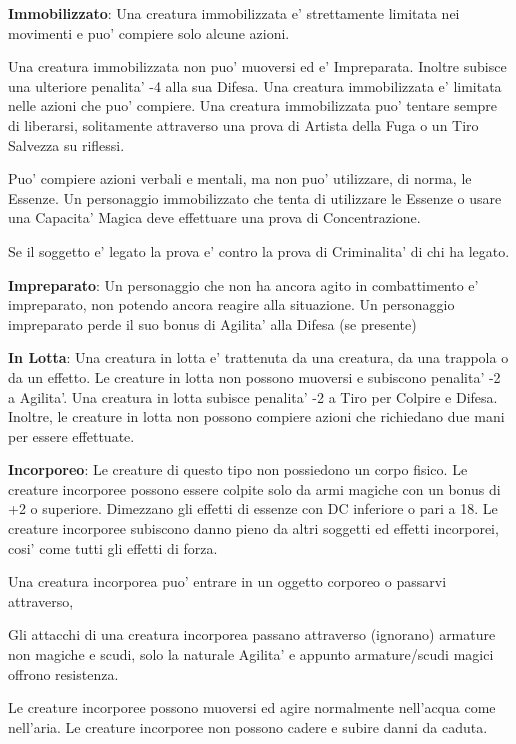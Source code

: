 \documentclass[a4paper,11pt,twoside,openany]{book}
\begin{document}
{		\textbf{Immobilizzato}: Una creatura immobilizzata e' strettamente limitata nei movimenti e puo' compiere solo alcune azioni.
		
		Una creatura immobilizzata non puo' muoversi ed e' Impreparata. Inoltre subisce una ulteriore penalita' -4 alla sua Difesa. Una creatura immobilizzata e' limitata nelle azioni che puo' compiere. Una creatura immobilizzata puo' tentare sempre di liberarsi, solitamente attraverso una prova di Artista della Fuga o un Tiro Salvezza su riflessi.
		
		Puo' compiere azioni verbali e mentali, ma non puo' utilizzare, di norma, le Essenze. Un personaggio immobilizzato che tenta di utilizzare le Essenze o usare una Capacita' Magica deve effettuare una prova di Concentrazione. 
		
		Se il soggetto e' legato la prova e' contro la prova di Criminalita' di chi ha legato.
		
		\textbf{Impreparato}: Un personaggio che non ha ancora agito in combattimento e' impreparato, non potendo ancora reagire alla situazione. Un personaggio impreparato perde il suo bonus di Agilita' alla Difesa (se presente)
		
		\textbf{In Lotta}: Una creatura in lotta e' trattenuta da una creatura,
		da una trappola o da un effetto. Le creature in lotta non possono
		muoversi e subiscono penalita' -2 a Agilita'. Una creatura in lotta
		subisce penalita' -2 a Tiro per Colpire e Difesa. Inoltre, le creature
		in lotta non possono compiere azioni che richiedano due mani per essere
		effettuate.
		
		\textbf{Incorporeo}: Le creature di questo tipo non possiedono un corpo fisico. Le creature incorporee possono essere colpite solo da armi magiche con un bonus di +2 o superiore. Dimezzano gli effetti di essenze con DC inferiore o pari a 18. Le creature incorporee subiscono danno pieno da altri soggetti ed effetti incorporei, cosi' come tutti gli effetti di forza.
		
		Una creatura incorporea puo' entrare in un oggetto corporeo o passarvi attraverso,
		
		Gli attacchi di una creatura incorporea passano attraverso (ignorano) armature non magiche e scudi, solo la naturale Agilita' e appunto armature/scudi magici offrono resistenza.
		
		Le creature incorporee possono muoversi ed agire normalmente nell'acqua come nell'aria. Le creature incorporee non possono cadere e subire danni da caduta.
		
}
\end{document}
